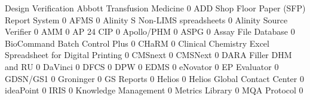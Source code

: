 \documentclass{article}
\begin{document}
\begin{Schunk}
\begin{Soutput}
                                                            Design Verification
  Abbott Transfusion Medicine                                                 0
  ADD Shop Floor Paper (SFP) Report System                                    0
  AFMS                                                                        0
  Alinity S Non-LIMS spreadsheets                                             0
  Alinity Source Verifier                                                     0
  AMM                                                                         0
  AP 24 CIP                                                                   0
  Apollo/PHM                                                                  0
  ASPG                                                                        0
  Assay File Database                                                         0
  BioCommand Batch Control Plus                                               0
  CHaRM                                                                       0
  Clinical Chemistry Excel Spreadsheet for Digital Printing                   0
  CMSnext                                                                     0
  CMSNext                                                                     0
  DARA Filler DHM and RU                                                      0
  DaVinci                                                                     0
  DFCS                                                                        0
  DPW                                                                         0
  EDMS                                                                        0
  eNovator                                                                    0
  EP Evaluator                                                                0
  GDSN/GS1                                                                    0
  Groninger                                                                   0
  GS Reports                                                                  0
  Helios                                                                      0
  Helios Global Contact Center                                                0
  ideaPoint                                                                   0
  IRIS                                                                        0
  Knowledge Management                                                        0
  Metrics Library                                                             0
  MQA Protocol                                                                0

\end{Soutput}
\end{Schunk}
\end{document}

